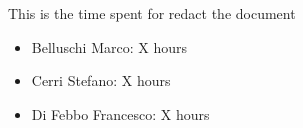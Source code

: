 This is the time spent for redact the document
\begin{itemize}
	\item Belluschi Marco:  X hours
	\item Cerri Stefano:  X hours
	\item Di Febbo Francesco: X hours
\end{itemize}